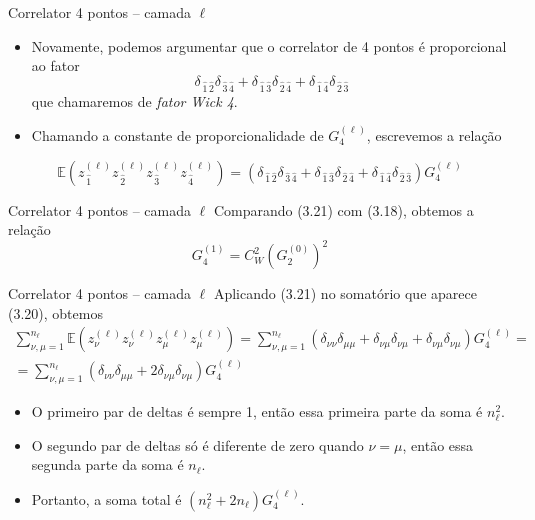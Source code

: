 \documentclass{beamer}
\newcommand{\EE}{\mathbb{E}}
\def\mi#1{{\,\widehat{#1}}}
\def\eell{{(\ell)}}
\def\wickquatro{\delta_{\mi1\mi2}\delta_{\mi3\mi4} + \delta_{\mi1\mi3}\delta_{\mi2\mi4}+  \delta_{\mi1\mi4}\delta_{\mi2\mi3}}
\begin{document}
\begin{frame}{Correlator 4 pontos -- camada $\ell$}
	\begin{itemize}
		\item Novamente, podemos argumentar que o correlator de 4 pontos é proporcional ao fator 
		 $$\wickquatro $$
		que chamaremos de \textit{fator Wick 4}.
		\item Chamando a constante de proporcionalidade de $G_4^\eell$, escrevemos a relação
	\end{itemize}

	\begin{equation*}\tag{3.21}
		\EE\left(z^\eell _\mi1 z^\eell_\mi2 z^\eell_\mi3 z^\eell_\mi4\right) = \left(\wickquatro \right)G_4^\eell
	\end{equation*}
\end{frame}

\begin{frame}{Correlator 4 pontos -- camada $\ell$}
	Comparando (3.21) com (3.18), obtemos a relação
	\begin{equation*}\tag{3.22}
		G_4^{(1)} = {C_W^2}\left(G_2^{(0)}\right)^2
	\end{equation*}
\end{frame}

\begin{frame}{Correlator 4 pontos -- camada $\ell$}
	Aplicando (3.21) no somatório que aparece (3.20), obtemos
	{\small
	\begin{multline*}\tag{3.23}
		\sum_{\nu,\mu=1}^{n_\ell} \EE\left( z^\eell_{\nu}z^\eell_{\nu} z^\eell_{\mu}z^\eell_{\mu}\right)
		= \sum_{\nu,\mu=1}^{n_\ell} \left( \delta_{\nu\nu}\delta_{\mu\mu} + \delta_{\nu\mu}\delta_{\nu\mu} + \delta_{\nu\mu}\delta_{\nu\mu}\right)G^\eell_4=\\
		= \sum_{\nu,\mu=1}^{n_\ell}  \left( \delta_{\nu\nu}\delta_{\mu\mu} + 2\delta_{\nu\mu}\delta_{\nu\mu}\right)G^\eell_4
		\end{multline*}
	}\begin{itemize}
			\item O primeiro par de deltas é sempre 1, então essa primeira parte da soma é $n_\ell^2$.
			\item O segundo par de deltas só é diferente de zero quando $\nu = \mu$, então essa segunda parte da soma é $n_\ell$.
			\item Portanto, a soma total é $\left(n_\ell^2 + 2n_\ell\right)G^\eell_4$.
		\end{itemize}
\end{frame}
\end{document}

